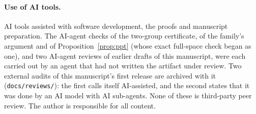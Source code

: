 \documentclass[aps,pra,twocolumn,superscriptaddress,nofootinbib,longbibliography,floatfix]{revtex4-2}
\begin{document}
\paragraph*{Use of AI tools.} AI tools assisted with software development, the proofs and manuscript preparation. The AI-agent checks of the two-group certificate, of the family's argument and of Proposition~\ref{prop:ppt} (whose exact full-space check began as one), and two AI-agent reviews of earlier drafts of this manuscript, were each carried out by an agent that had not written the artifact under review. Two external audits of this manuscript's first release are archived with it (\nolinkurl{docs/reviews/}): the first calls itself AI-assisted, and the second states that it was done by an AI model with AI sub-agents. None of these is third-party peer review. The author is responsible for all content.


\end{document}
